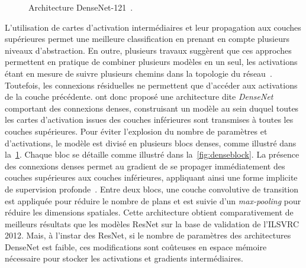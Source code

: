 \begin{figure}[t]
  \resizebox{\textwidth}{!}{
    
  }
  \caption[Architecture DenseNet-121.]{Architecture DenseNet-121~\cite{huang_densely_2017}.}
  \label{fig:densenet}
\end{figure}


L'utilisation de cartes d'activation intermédiaires et leur propagation aux couches supérieures permet une meilleure classification en prenant en compte plusieurs niveaux d'abstraction. En outre, plusieurs travaux suggèrent que ces approches permettent en pratique de combiner plusieurs modèles en un seul, les activations étant en mesure de suivre plusieurs chemins dans la topologie du réseau~\cite{veit_residual_2016,huang_deep_2016}. Toutefois, les connexions résiduelles ne permettent que d'accéder aux activations de la couche précédente. \citet{huang_densely_2017} ont donc proposé une architecture dite \emph{DenseNet} comportant des connexions denses, construisant un modèle au sein duquel toutes les cartes d'activation issues des couches inférieures sont transmises à toutes les couches supérieures. Pour éviter l'explosion du nombre de paramètres et d'activations, le modèle est divisé en plusieurs blocs denses, comme illustré dans la~\cref{fig:densenet}. Chaque bloc se détaille comme illustré dans la~\cref{fig:denseblock}. La présence des connexions denses permet au gradient de se propager immédiatement des couches supérieures aux couches inférieures, appliquant ainsi une forme implicite de supervision profonde~\cite{lee_deeply-supervised_2015}. Entre deux blocs, une couche convolutive de transition est appliquée pour réduire le nombre de plans et est suivie d'un \emph{max-pooling} pour réduire les dimensions spatiales. Cette architecture obtient comparativement de meilleurs résultats que les modèles ResNet sur la base de validation de l'\gls{ILSVRC} 2012. Mais, à l'instar des ResNet, si le nombre de paramètres des architectures DenseNet est faible, ces modifications sont coûteuses en espace mémoire nécessaire pour stocker les activations et gradients intermédiaires.

